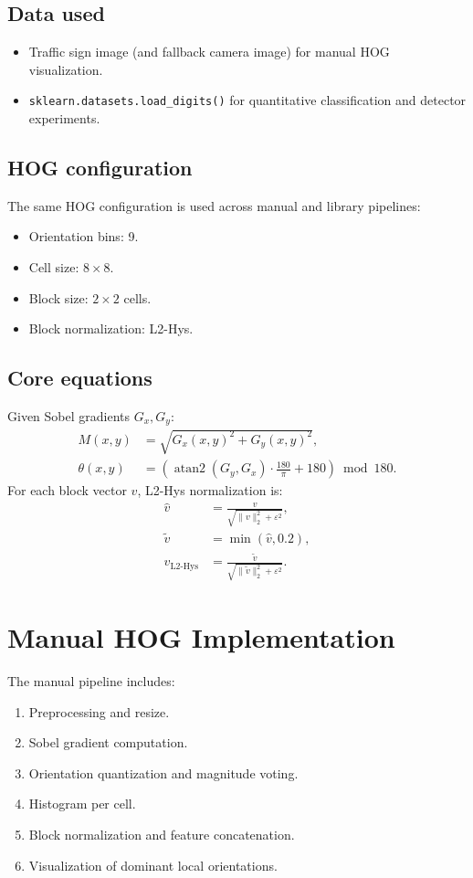\documentclass[12pt,a4paper]{article}
\begin{document}
\subsection{Data used}
\begin{itemize}
    \item Traffic sign image (and fallback camera image) for manual HOG visualization.
    \item \texttt{sklearn.datasets.load\_digits()} for quantitative classification and detector experiments.
\end{itemize}

\subsection{HOG configuration}
The same HOG configuration is used across manual and library pipelines:
\begin{itemize}
    \item Orientation bins: 9.
    \item Cell size: $8\times8$.
    \item Block size: $2\times2$ cells.
    \item Block normalization: L2-Hys.
\end{itemize}

\subsection{Core equations}
Given Sobel gradients $G_x, G_y$:
\begin{align}
M(x,y) &= \sqrt{G_x(x,y)^2 + G_y(x,y)^2},\\
\theta(x,y) &= \left(\operatorname{atan2}(G_y, G_x)\cdot \frac{180}{\pi} + 180\right) \bmod 180.
\end{align}
For each block vector $v$, L2-Hys normalization is:
\begin{align}
\hat{v} &= \frac{v}{\sqrt{\|v\|_2^2 + \varepsilon^2}},\\
\tilde{v} &= \min(\hat{v}, 0.2),\\
v_{\text{L2-Hys}} &= \frac{\tilde{v}}{\sqrt{\|\tilde{v}\|_2^2 + \varepsilon^2}}.
\end{align}

\section{Manual HOG Implementation}
The manual pipeline includes:
\begin{enumerate}
    \item Preprocessing and resize.
    \item Sobel gradient computation.
    \item Orientation quantization and magnitude voting.
    \item Histogram per cell.
    \item Block normalization and feature concatenation.
    \item Visualization of dominant local orientations.
\end{enumerate}
\end{document}
